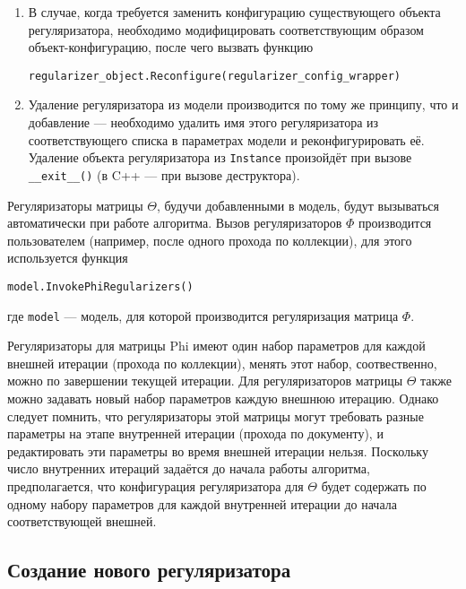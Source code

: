\begin{enumerate}
	\item В случае, когда требуется заменить конфигурацию существующего объекта регуляризатора, необходимо модифицировать соответствующим образом объект-конфигурацию, после чего вызвать функцию 
	
	\vspace{10pt}
	\verb|regularizer_object.Reconfigure(regularizer_config_wrapper)| 
	\vspace{10pt}
	
	\item Удаление регуляризатора из модели производится по тому же принципу, что и добавление --- необходимо удалить имя этого регуляризатора из соответствующего списка в параметрах модели и реконфигурировать её. Удаление объекта регуляризатора из \verb'Instance' произойдёт при вызове \verb'__exit__()' (в C++ --- при вызове деструктора).
			
\end{enumerate}

Регуляризаторы матрицы $\Theta$, будучи добавленными в модель, будут вызываться автоматически при работе алгоритма. Вызов регуляризаторов $\Phi$ производится пользователем (например, после одного прохода по коллекции), для этого используется функция

	\vspace{10pt}
	\verb|model.InvokePhiRegularizers()| 
	\vspace{10pt}
	
\noindent где \verb'model' --- модель, для которой производится регуляризация матрица $\Phi$.

Регуляризаторы для матрицы Phi имеют один набор параметров для каждой внешней итерации (прохода по коллекции), менять этот набор, соотвественно, можно по завершении текущей итерации. Для регуляризаторов матрицы $\Theta$ также можно задавать новый набор параметров каждую внешнюю итерацию. Однако следует помнить, что регуляризаторы этой матрицы могут требовать разные параметры на этапе внутренней итерации (прохода по документу), и редактировать эти параметры во время внешней итерации нельзя. Поскольку число внутренних итераций задаётся до начала работы алгоритма, предполагается, что конфигурация регуляризатора для $\Theta$ будет содержать по одному набору параметров для каждой внутренней итерации до начала соответствующей внешней.

\subsection{Создание нового регуляризатора}

